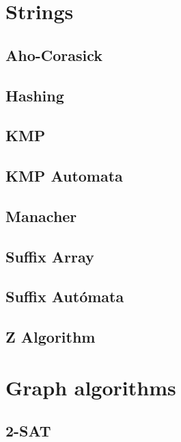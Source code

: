 \section{Strings}
\subsection{Aho-Corasick}
\raggedbottom
\hrulefill
\subsection{	Hashing}
\raggedbottom
\hrulefill
\subsection{	KMP}
\raggedbottom
\hrulefill
\subsection{KMP Automata}
\raggedbottom
\hrulefill
\subsection{Manacher}
\raggedbottom
\hrulefill
\subsection{Suffix Array}
\raggedbottom
\hrulefill
\subsection{Suffix Autómata}
\raggedbottom
\hrulefill
\subsection{   Z Algorithm}
\raggedbottom
\hrulefill

\section{Graph algorithms}
\subsection{   2-SAT}
\raggedbottom
\hrulefill
